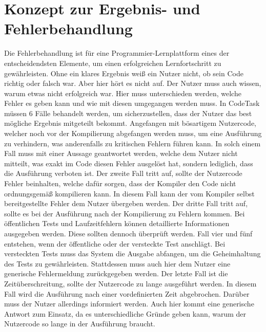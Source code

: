 \section{Konzept zur Ergebnis- und Fehlerbehandlung}
Die Fehlerbehandlung ist für eine Programmier-Lernplattform eines der entscheidendsten Elemente, um einen erfolgreichen Lernfortschritt zu gewährleisten. Ohne ein klares Ergebnis weiß ein Nutzer nicht, ob sein Code richtig oder falsch war. Aber hier hört es nicht auf. Der Nutzer muss auch wissen, warum etwas nicht erfolgreich war. Hier muss unterschieden werden, welche Fehler es geben kann und wie mit diesen umgegangen werden muss. In CodeTask müssen 6 Fälle behandelt werden, um sicherzustellen, dass der Nutzer das best mögliche Ergebnis mitgeteilt bekommt. Angefangen mit bösartigem Nutzercode, welcher noch vor der Kompilierung abgefangen werden muss, um eine Ausführung zu verhindern, was anderenfalls zu kritischen Fehlern führen kann. In solch einem Fall muss mit einer Aussage geantwortet werden, welche dem Nutzer nicht mitteilt, was exakt im Code diesen Fehler ausgelöst hat, sondern lediglich, dass die Ausführung verboten ist. Der zweite Fall tritt auf, sollte der Nutzercode Fehler beinhalten, welche dafür sorgen, dass der Kompiler den Code nicht ordnungsgemäß kompilieren kann. In diesem Fall kann der vom Kompiler selbst bereitgestellte Fehler dem Nutzer übergeben werden. Der dritte Fall tritt auf, sollte es bei der Ausführung nach der Kompilierung zu Fehlern kommen. Bei öffentlichen Tests und Laufzeitfehlern können detaillierte Informationen ausgegeben werden. Diese sollten dennoch überprüft werden. Fall vier und fünf entstehen, wenn der öffentliche oder der versteckte Test anschlägt. Bei versteckten Tests muss das System die Ausgabe abfangen, um die Geheimhaltung des Tests zu gewährleisten. Stattdessen muss auch hier dem Nutzer eine generische Fehlermeldung zurückgegeben werden. Der letzte Fall ist die Zeitüberschreitung, sollte der Nutzercode zu lange ausgeführt werden. In diesem Fall wird die Ausführung nach einer vordefinierten Zeit abgebrochen. Darüber muss der Nutzer allerdings informiert werden. Auch hier kommt eine generische Antwort zum Einsatz, da es unterschiedliche Gründe geben kann, warum der Nutzercode so lange in der Ausführung braucht.


